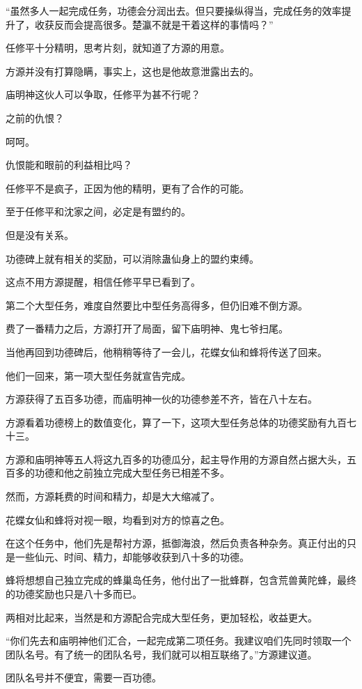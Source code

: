 \begin{this_body}
“虽然多人一起完成任务，功德会分润出去。但只要操纵得当，完成任务的效率提升了，收获反而会提高很多。楚瀛不就是干着这样的事情吗？”

任修平十分精明，思考片刻，就知道了方源的用意。

方源并没有打算隐瞒，事实上，这也是他故意泄露出去的。

庙明神这伙人可以争取，任修平为甚不行呢？

之前的仇恨？

呵呵。

仇恨能和眼前的利益相比吗？

任修平不是疯子，正因为他的精明，更有了合作的可能。

至于任修平和沈家之间，必定是有盟约的。

但是没有关系。

功德碑上就有相关的奖励，可以消除蛊仙身上的盟约束缚。

这点不用方源提醒，相信任修平早已看到了。

第二个大型任务，难度自然要比中型任务高得多，但仍旧难不倒方源。

费了一番精力之后，方源打开了局面，留下庙明神、鬼七爷扫尾。

当他再回到功德碑后，他稍稍等待了一会儿，花蝶女仙和蜂将传送了回来。

他们一回来，第一项大型任务就宣告完成。

方源获得了五百多功德，而庙明神一伙的功德参差不齐，皆在八十左右。

方源看着功德榜上的数值变化，算了一下，这项大型任务总体的功德奖励有九百七十三。

方源和庙明神等五人将这九百多的功德瓜分，起主导作用的方源自然占据大头，五百多的功德和他之前独立完成大型任务已相差不多。

然而，方源耗费的时间和精力，却是大大缩减了。

花蝶女仙和蜂将对视一眼，均看到对方的惊喜之色。

在这个任务中，他们先是帮衬方源，抵御海浪，然后负责各种杂务。真正付出的只是一些仙元、时间、精力，却能够收获到八十多的功德。

蜂将想想自己独立完成的蜂巢岛任务，他付出了一批蜂群，包含荒兽黄陀蜂，最终的功德奖励也只是八十多而已。

两相对比起来，当然是和方源配合完成大型任务，更加轻松，收益更大。

“你们先去和庙明神他们汇合，一起完成第二项任务。我建议咱们先同时领取一个团队名号。有了统一的团队名号，我们就可以相互联络了。”方源建议道。

团队名号并不便宜，需要一百功德。


\end{this_body}
